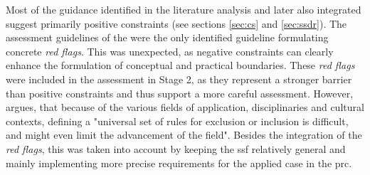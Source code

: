 Most of the guidance identified in the literature analysis and later also integrated suggest primarily positive constraints  (see sections \ref{sec:cs} and \ref{sec:ssdr}). The assessment guidelines of the \autocite{ifrcCommunityBasedSurveillanceGuiding2017} were the only identified guideline formulating concrete \textit{red flags}. This was unexpected, as negative constraints can clearly enhance the formulation of conceptual and practical boundaries. These \textit{red flags} were included in the assessment in Stage 2, as they represent a stronger barrier than positive constraints and thus support a more careful assessment. However, \autocite[1]{escaECSACharacteristicsCitizen2020} argues, that because of the various fields of application, disciplinaries and cultural contexts, defining a "universal set of rules for exclusion or inclusion is difficult, and might even limit the advancement of the field". Besides the integration of the \textit{red flags}, this was taken into account by keeping the \acrshort{ssf} relatively general and mainly implementing more precise requirements for the applied case in the \acrshort{prc}.\newline

